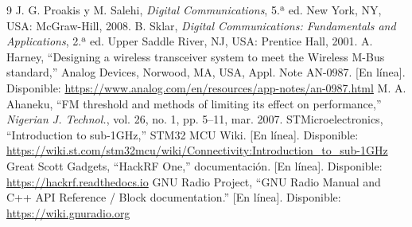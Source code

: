\documentclass[10pt,twocolumn,letterpaper]{article}
\begin{document}
\begin{thebibliography}{9}\footnotesize
{} J. G. Proakis y M. Salehi, \emph{Digital Communications}, 5.ª ed. New York, NY, USA: McGraw-Hill, 2008.
 B. Sklar, \emph{Digital Communications: Fundamentals and Applications}, 2.ª ed. Upper Saddle River, NJ, USA: Prentice Hall, 2001.
 A. Harney, ``Designing a wireless transceiver system to meet the Wireless M-Bus standard,'' Analog Devices, Norwood, MA, USA, Appl. Note AN-0987. [En línea]. Disponible: \url{https://www.analog.com/en/resources/app-notes/an-0987.html}
 M. A. Ahaneku, ``FM threshold and methods of limiting its effect on performance,'' \emph{Nigerian J. Technol.}, vol. 26, no. 1, pp. 5--11, mar. 2007.
 STMicroelectronics, ``Introduction to sub-1GHz,'' STM32 MCU Wiki. [En línea]. Disponible: \url{https://wiki.st.com/stm32mcu/wiki/Connectivity:Introduction_to_sub-1GHz}
 Great Scott Gadgets, ``HackRF One,'' documentación. [En línea]. Disponible: \url{https://hackrf.readthedocs.io}
 GNU Radio Project, ``GNU Radio Manual and C++ API Reference / Block documentation.'' [En línea]. Disponible: \url{https://wiki.gnuradio.org}
\end{thebibliography}
\end{document}
